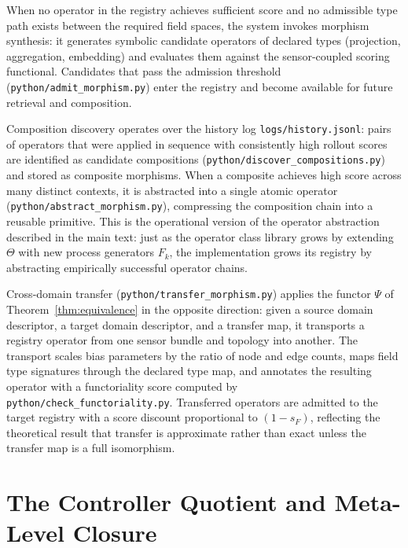 \documentclass[11pt, oneside]{article}
\begin{document}
When no operator in the registry achieves sufficient score and no admissible type path
exists between the required field spaces, the system invokes morphism synthesis: it
generates symbolic candidate operators of declared types (projection, aggregation,
embedding) and evaluates them against the sensor-coupled scoring functional. Candidates
that pass the admission threshold (\texttt{python/admit\_morphism.py}) enter the registry
and become available for future retrieval and composition.

Composition discovery operates over the history log \texttt{logs/history.jsonl}: pairs
of operators that were applied in sequence with consistently high rollout scores are
identified as candidate compositions (\texttt{python/discover\_compositions.py}) and
stored as composite morphisms. When a composite achieves high score across many distinct
contexts, it is abstracted into a single atomic operator (\texttt{python/abstract\_morphism.py}),
compressing the composition chain into a reusable primitive. This is the operational
version of the operator abstraction described in the main text: just as the operator
class library grows by extending $\Theta$ with new process generators $F_k$, the
implementation grows its registry by abstracting empirically successful operator chains.

Cross-domain transfer (\texttt{python/transfer\_morphism.py}) applies the functor
$\Psi$ of Theorem~\ref{thm:equivalence} in the opposite direction: given a source domain
descriptor, a target domain descriptor, and a transfer map, it transports a registry
operator from one sensor bundle and topology into another. The transport scales
bias parameters by the ratio of node and edge counts, maps field type signatures through
the declared type map, and annotates the resulting operator with a functoriality score
computed by \texttt{python/check\_functoriality.py}. Transferred operators are admitted
to the target registry with a score discount proportional to $(1 - s_F)$, reflecting
the theoretical result that transfer is approximate rather than exact unless the transfer
map is a full isomorphism.

\section{The Controller Quotient and Meta-Level Closure}
\label{app:controller_quotient}
\end{document}
